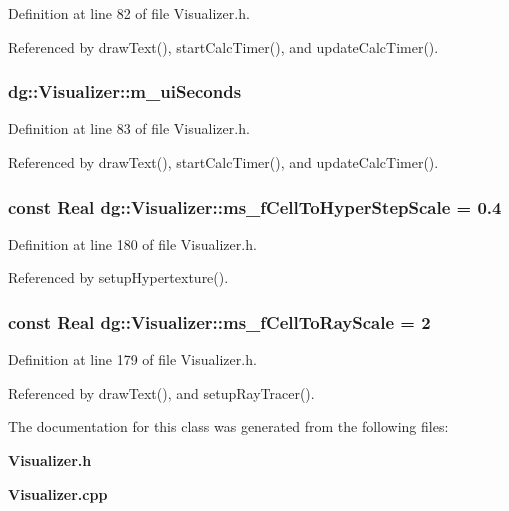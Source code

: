 Definition at line 82 of file Visualizer.h.

Referenced by draw\-Text(), start\-Calc\-Timer(), and update\-Calc\-Timer().
\subsubsection{ dg::Visualizer::m\_\-ui\-Seconds\hspace{0.3cm}{\tt  [protected]}}\label{classdg_1_1Visualizer_n3}




Definition at line 83 of file Visualizer.h.

Referenced by draw\-Text(), start\-Calc\-Timer(), and update\-Calc\-Timer().
\subsubsection{\setlength{\rightskip}{0pt plus 5cm}const {\bf Real} dg::Visualizer::ms\_\-f\-Cell\-To\-Hyper\-Step\-Scale = 0.4\hspace{0.3cm}{\tt  [static, protected]}}\label{classdg_1_1Visualizer_q1}




Definition at line 180 of file Visualizer.h.

Referenced by setup\-Hypertexture().
\subsubsection{\setlength{\rightskip}{0pt plus 5cm}const {\bf Real} dg::Visualizer::ms\_\-f\-Cell\-To\-Ray\-Scale = 2\hspace{0.3cm}{\tt  [static, protected]}}\label{classdg_1_1Visualizer_q0}




Definition at line 179 of file Visualizer.h.

Referenced by draw\-Text(), and setup\-Ray\-Tracer().

The documentation for this class was generated from the following files:\begin{CompactItemize}
\item 
{\bf Visualizer.h}\item 
{\bf Visualizer.cpp}\end{CompactItemize}

